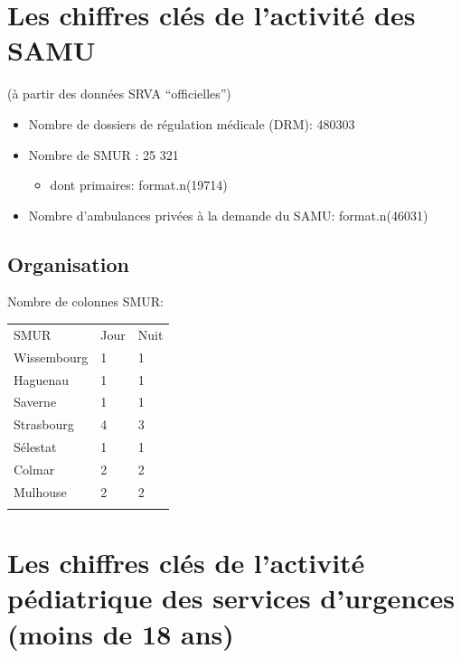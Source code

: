 \documentclass[]{article}
\begin{document}
\section{Les chiffres clés de l'activité des
SAMU}\label{les-chiffres-cles-de-lactivite-des-samu}

(à partir des données SRVA ``officielles'')

\begin{itemize}
\itemsep1pt\parskip0pt
\item
  Nombre de dossiers de régulation médicale (DRM): 480303
\item
  Nombre de SMUR : 25 321

  \begin{itemize}
  \itemsep1pt\parskip0pt
  \item
    dont primaires: format.n(19714)
  \end{itemize}
\item
  Nombre d'ambulances privées à la demande du SAMU: format.n(46031)
\end{itemize}

\subsection{Organisation}\label{organisation}

Nombre de colonnes SMUR:

\begin{longtable}[c]{@{}lll@{}}
\toprule\addlinespace
SMUR & Jour & Nuit
\\\addlinespace
\midrule\endhead
Wissembourg & 1 & 1
\\\addlinespace
Haguenau & 1 & 1
\\\addlinespace
Saverne & 1 & 1
\\\addlinespace
Strasbourg & 4 & 3
\\\addlinespace
Sélestat & 1 & 1
\\\addlinespace
Colmar & 2 & 2
\\\addlinespace
Mulhouse & 2 & 2
\\\addlinespace
\bottomrule
\end{longtable}

\section{Les chiffres clés de l'activité pédiatrique des services
d'urgences (moins de 18
ans)}\label{les-chiffres-cles-de-lactivite-pediatrique-des-services-durgences-moins-de-18-ans}
\end{document}
